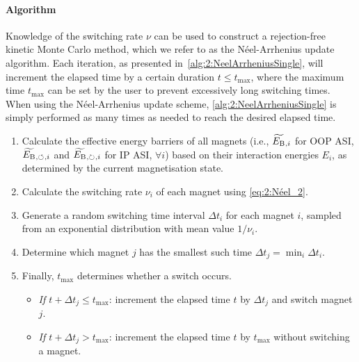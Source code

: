 \paragraph{Algorithm}
Knowledge of the switching rate $\nu$ can be used to construct a rejection-free kinetic Monte Carlo method, which we refer to as the N\'eel-Arrhenius update algorithm.
Each iteration, as presented in~\cref{alg:2:NeelArrheniusSingle}, will increment the elapsed time by a certain duration $t \leq t_\mathrm{max}$, where the maximum time $t_\mathrm{max}$ can be set by the user to prevent excessively long switching times.
When using the N\'eel-Arrhenius update scheme, \cref{alg:2:NeelArrheniusSingle} is simply performed as many times as needed to reach the desired elapsed time. \par
\begin{algorithm}
	\label{alg:2:NeelArrheniusSingle}
	\begin{enumerate}[rightmargin=15pt]
		\item Calculate the effective energy barriers of all magnets (i.e., $\widetilde{E_\mathrm{B}}{}_{,i}$ for OOP ASI, $\widetilde{E_\mathrm{B}}{}_{,\circlearrowleft}{}_{,i}$ and $\widetilde{E_\mathrm{B}}{}_{,\circlearrowright}{}_{,i}$ for IP ASI, $\forall i$) based on their interaction energies $E_i$, as determined by the current magnetisation state.
		\item Calculate the switching rate $\nu_i$ of each magnet using \cref{eq:2:Néel_2}.
		\item Generate a random switching time interval $\Delta t_i$ for each magnet $i$, sampled from an exponential distribution with mean value $1/\nu_i$.
		\item Determine which magnet $j$ has the smallest such time $\Delta t_j = \min_i \Delta t_i$.
		\item Finally, $t_\mathrm{max}$ determines whether a switch occurs.
		\begin{itemize}
			\item \textit{If $t + \Delta t_j \leq t_\mathrm{max}$}: increment the elapsed time $t$ by $\Delta t_j$ and switch magnet $j$.
			\item \textit{If $t + \Delta t_j > t_\mathrm{max}$}: increment the elapsed time $t$ by $t_\mathrm{max}$ without switching a magnet.
		\end{itemize}
	\end{enumerate} %
\end{algorithm}
